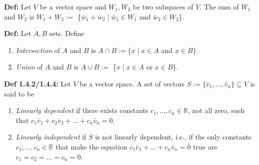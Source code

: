 \textbf{Def:} Let $V$ be a vector space and $W_1, W_2$ be two subspaces of $V$. The sum of $W_1$ and $W_2$ is $W_1 + W_2 :=$ \{$\bar w_1 + \bar w_2 \mid \bar w_1 \in W_1$ and $\bar w_2 \in W_2$\}.

\bigskip

\noindent
\textbf{Def:} Let $A, B$ sets. Define
\begin{enumerate}
    \item \textit{Intersection} of $A$ and $B$ is $A \cap B := \{ x \mid x \in A$ and $x \in B \}$.
    \item \textit{Union} of $A$ and $B$ is $A \cup B := $ \{$x \mid x \in A$ or $x \in B$\}.
\end{enumerate}

\bigskip

\noindent
\textbf{Def 1.4.2/1.4.4:} Let $V$ be a vector space. A set of vectors $S := \{ \bar v_1 , ... , \bar v_n \} \subseteq V$ is said to be 
\begin{enumerate}
    \item \textit{Linearly dependent} if there exists constants $ c_1, ..., c_n \in \mathbb{R} $, not all zero, such that $c_1 \bar v_1 + c_2 \bar v_2 + ... + c_n \bar v_n = 0$.
    \item \textit{Linearly independent} if $S$ is not linearly dependent, i.e., if the only constants $c_1, ..., c_n \in \mathbb{R}$ that make the equation $c_1 \bar v_1 + ... + c_n \bar v_n = \bar 0$ true are $c_1 = c_2 = ... = c_n = 0$.
\end{enumerate}

